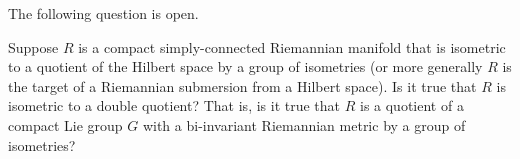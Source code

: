 The following question is open.

\begin{pr} Suppose $R$ is a compact simply-connected Riemannian manifold that is isometric to a quotient of the Hilbert space by a group of isometries (or more generally $R$ is the target of a Riemannian submersion from a Hilbert space).
Is it true that $R$ is isometric to a double quotient? That is, is it true that $R$ is a quotient of a compact Lie group $G$
with a bi-invariant Riemannian metric
by a group of isometries?
 
\end{pr}
